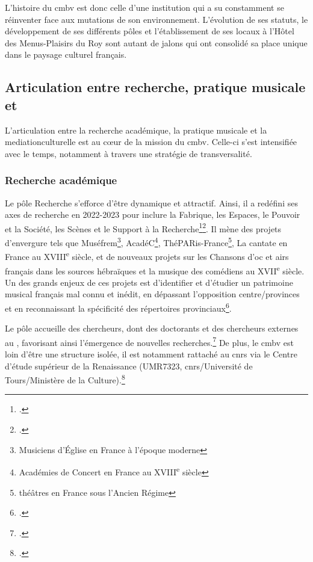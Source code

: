 L'histoire du \gls{cmbv} est donc celle d'une institution qui a su constamment se réinventer face aux mutations de son environnement. L'évolution de ses statuts, le développement de ses différents pôles et l'établissement de ses locaux à l'Hôtel des Menus-Plaisirs du Roy sont autant de jalons qui ont consolidé sa place unique dans le paysage culturel français.

\subsection{Articulation entre recherche, pratique musicale et }

L'articulation entre la recherche académique, la pratique musicale et la \gls{mediationculturelle} est au cœur de la mission du \gls{cmbv}. Celle-ci s'est intensifiée avec le temps, notamment à travers une stratégie de transversalité.

\subsubsection{Recherche académique}

Le pôle Recherche s'efforce d'être dynamique et attractif. Ainsi, il a redéfini ses axes de recherche en 2022-2023 pour inclure la Fabrique, les Espaces, le Pouvoir et la Société, les Scènes et le Support à la Recherche\footcite{centredemusiquebaroquedeversaillesProjetEtablissement2022}\footcite{centredemusiquebaroquedeversaillesRapportActivite2023}. Il mène des projets d'envergure tels que Muséfrem\footnote{Musiciens d’Église en France à l’époque moderne}, AcadéC\footnote{Académies de Concert en France au XVIII\textsuperscript{e} siècle}, ThéPARis-France\footnote{théâtres en France sous l'Ancien Régime}, La cantate en France au XVIII\textsuperscript{e} siècle, et de nouveaux projets sur les Chansons d'oc et airs français dans les sources hébraïques et la musique des comédiens au XVII\textsuperscript{e} siècle. Un des grands enjeux de ces projets est d'identifier et d'étudier un patrimoine musical français mal connu et inédit, en dépassant l'opposition centre/provinces et en reconnaissant la spécificité des répertoires provinciaux\footcite{AcadeCAcademiesConcert}.

Le pôle accueille des chercheurs, dont des doctorants et des chercheurs externes au , favorisant ainsi l'émergence de nouvelles recherches.\footcite{centredemusiquebaroquedeversaillesProjetEtablissement2022} De plus, le \gls{cmbv} est loin d'être une structure isolée, il est notamment rattaché au \gls{cnrs} via le Centre d'étude supérieur de la Renaissance (UMR7323, \gls{cnrs}/Université de Tours/Ministère de la Culture).\footcite{buchernicolasSciencesPartageesPuisqu2022}

